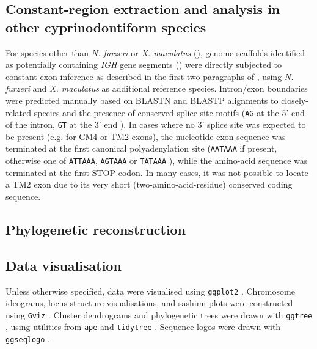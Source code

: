 \subsection{Constant-region extraction and analysis in other cyprinodontiform species}
\label{sec:ch_char_crossspecies}

For species other than \textit{N. furzeri} or \textit{X. maculatus} (), genome scaffolds identified as potentially containing \textit{IGH} gene segments () were directly subjected to constant-exon inference as described in the first two paragraphs of , using \textit{N. furzeri} and \textit{X. maculatus} as additional reference species. Intron/exon boundaries were predicted manually based on BLASTN and BLASTP alignments to closely-related species and the presence of conserved splice-site motifs (\texttt{AG} at the 5' end of the intron, \texttt{GT} at the 3' end \citep{shapiro1987splice}). In cases where no 3' splice site was expected to be present (e.g. for CM4 or TM2 exons), the nucleotide exon sequence was terminated at the first canonical polyadenylation site (\texttt{AATAAA} if present, otherwise one of \texttt{ATTAAA}, \texttt{AGTAAA} or \texttt{TATAAA} \citep{ulitsky2012polya}), while the amino-acid sequence was terminated at the first STOP codon. In many cases, it was not possible to locate a TM2 exon due to its very short (two-amino-acid-residue) conserved coding sequence. %

\subsection{Phylogenetic reconstruction}
\label{sec:phylo_methods}

\subsection{Data visualisation}

Unless otherwise specified, data were visualised using \lstinline[language=R]{ggplot2} \citep{wickham2016ggplot2}. Chromosome ideograms, locus structure visualisations, and sashimi plots were constructed using \lstinline[language=R]{Gviz} \citep{hahne2016gviz}. Cluster dendrograms and phylogenetic trees were drawn with \lstinline[language=R]{ggtree} \citep{guangchuang2018ggtree}, using utilities from \lstinline[language=R]{ape} \citep{paradis2018ape} and \lstinline[language=R]{tidytree} \citep{guangchuang2018tidytree}. Sequence logos were drawn with \lstinline[language=R]{ggseqlogo} \citep{wagih2017ggseqlogo}. 

